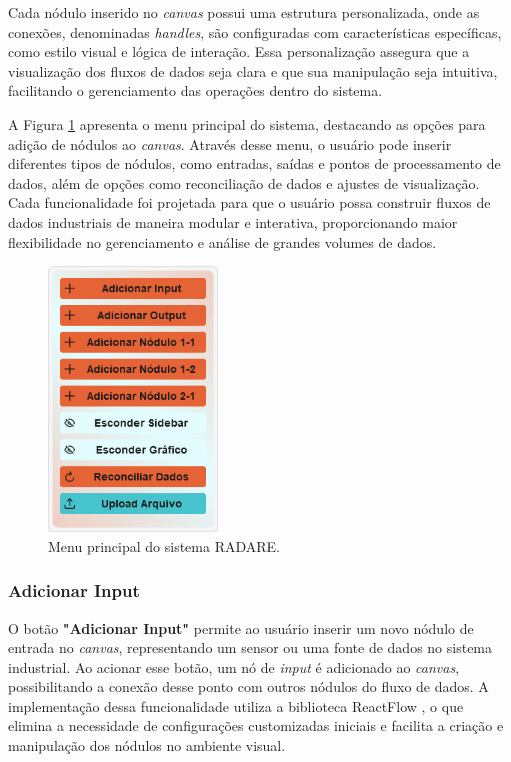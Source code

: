 Cada nódulo inserido no \textit{canvas} possui uma estrutura personalizada, onde as conexões, denominadas \textit{handles}, são configuradas com características específicas, como estilo visual e lógica de interação. Essa personalização assegura que a visualização dos fluxos de dados seja clara e que sua manipulação seja intuitiva, facilitando o gerenciamento das operações dentro do sistema.

A Figura \ref{Fig:MenuImage} apresenta o menu principal do sistema, destacando as opções para adição de nódulos ao \textit{canvas}. Através desse menu, o usuário pode inserir diferentes tipos de nódulos, como entradas, saídas e pontos de processamento de dados, além de opções como reconciliação de dados e ajustes de visualização. Cada funcionalidade foi projetada para que o usuário possa construir fluxos de dados industriais de maneira modular e interativa, proporcionando maior flexibilidade no gerenciamento e análise de grandes volumes de dados.

\begin{figure}[htbp]
    \centering
    \includegraphics[width=0.4\textwidth]{figuras/menu-image.png}
    \caption{Menu principal do sistema RADARE.}
    \label{Fig:MenuImage}
\end{figure}

\subsubsection{Adicionar Input}

O botão \textbf{"Adicionar Input"} permite ao usuário inserir um novo nódulo de entrada no \textit{canvas}, representando um sensor ou uma fonte de dados no sistema industrial. Ao acionar esse botão, um nó de \textit{input} é adicionado ao \textit{canvas}, possibilitando a conexão desse ponto com outros nódulos do fluxo de dados. A implementação dessa funcionalidade utiliza a biblioteca ReactFlow \cite{reactflow}, o que elimina a necessidade de configurações customizadas iniciais e facilita a criação e manipulação dos nódulos no ambiente visual.

